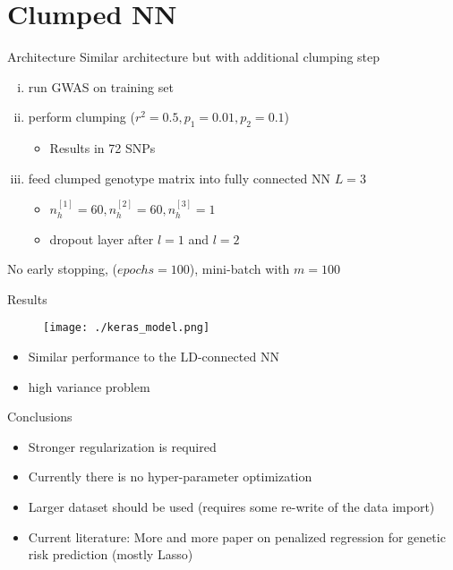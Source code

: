 \documentclass{beamer}
\begin{document}
\section{Clumped NN}

\begin{frame}[t]{Architecture}
  Similar architecture but with additional clumping step

  \begin{enumerate}[(i)]
    \item run GWAS on training set
    \item perform clumping ($r^2=0.5, p_1 = 0.01, p_2 = 0.1$) 
      \begin{itemize}
        \item Results in 72 SNPs
      \end{itemize}
    \item feed clumped genotype matrix into fully connected NN $L=3$
      \begin{itemize}
        \item $n^{[1]}_h=60, n^{[2]}_h=60, n^{[3]}_h=1$
        \item dropout layer after $l=1$ and $l=2$
      \end{itemize}
  \end{enumerate}
  No early stopping, ($epochs=100$), mini-batch with $m=100$
\end{frame}

\begin{frame}[t]{Results}
  \begin{figure}[htpb]
    \centering
    \texttt{[image: ./keras\_model.png]}
  \end{figure}
  \begin{itemize}
    \item Similar performance to the LD-connected NN
    \item high variance problem
  \end{itemize}
\end{frame}

\begin{frame}[t]{Conclusions}
  \begin{itemize}
    \item Stronger regularization is required
    \item Currently there is no hyper-parameter optimization
    \item Larger dataset should be used (requires some re-write of the data import)
    \item Current literature: More and more paper on penalized regression for genetic risk prediction (mostly Lasso)
  \end{itemize}
\end{frame}
\end{document}
